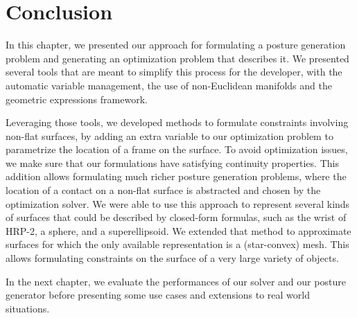\section{Conclusion}
\label{sec:conclusion_ch5}

In this chapter, we presented our approach for formulating a posture generation problem and generating an optimization problem that describes it.
We presented several tools that are meant to simplify this process for the developer, with the automatic variable management, the use of non-Euclidean manifolds and the geometric expressions framework.

Leveraging those tools, we developed methods to formulate constraints involving non-flat surfaces, by adding an extra variable to our optimization problem to parametrize the location of a frame on the surface.
To avoid optimization issues, we make sure that our formulations have satisfying continuity properties.
This addition allows formulating much richer posture generation problems, where the location of a contact on a non-flat surface is abstracted and chosen by the optimization solver.
We were able to use this approach to represent several kinds of surfaces that could be described by closed-form formulas, such as the wrist of HRP-2, a sphere, and a superellipsoid.
We extended that method to approximate surfaces for which the only available representation is a (star-convex) mesh.
This allows formulating constraints on the surface of a very large variety of objects.

In the next chapter, we evaluate the performances of our solver and our posture generator before presenting some use cases and extensions to real world situations.

